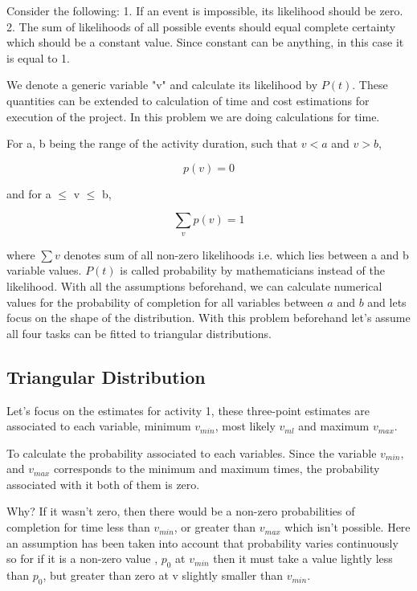 Consider the following:
1. If an event is impossible, its likelihood should be zero.
2. The sum of likelihoods of all possible events should equal complete certainty which should be a constant value. Since constant can be anything, in this case it is equal to 1.

We denote a generic variable "v" and calculate its likelihood by $ P(t)$. These quantities can be extended to calculation of time and cost estimations for execution of the project. In this problem we are doing calculations for time.

For a, b being the range of the activity duration, such that $v < a$ and $v > b$,

\begin{equation}
	p(v)  = 0 
\end{equation}

and for  a $\leqslant$ v $\leqslant$ b,

\begin{equation}
\sum_{v} p(v) = 1
\end{equation}

where $\sum{v}$ denotes sum of all non-zero likelihoods i.e. which lies between a and b variable values. $P(t)$ is called probability by mathematicians instead of the likelihood. With all the assumptions beforehand, we can calculate numerical values for the probability of completion for all variables between $a$ and $b$ and lets focus on the shape of the distribution. With this problem beforehand let's assume all four tasks can be fitted to triangular distributions.


\subsection{Triangular Distribution}

Let's focus on the estimates for activity 1, these three-point estimates are associated to each variable, minimum $v_ {min}$, most likely $v_ {ml}$ and maximum $v_ {max}$.

To calculate the probability associated to each variables. Since the variable $v_ {min}$, and $v_ {max}$ corresponds to the minimum and maximum times, the probability associated with it both of them is zero. 

Why?
If it wasn't zero, then there would be a non-zero probabilities of completion for time less than $v_{min}$, or greater than $v_{max}$ which isn't possible. Here an assumption has been taken into account that probability varies continuously so for if it is a non-zero value , $p_{0}$  at $v_{min}$ then it must take a value lightly less than $p_{0}$, but greater than zero at v slightly smaller than $v_{min}$.

